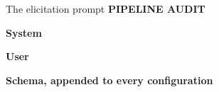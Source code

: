 \documentclass[9pt, aspectratio=169, t]{beamer}
\begin{document}
\begin{frame}{The elicitation prompt}
  \hfill\textcolor{MainBlue}{\scriptsize\textbf{PIPELINE AUDIT}}\par\vspace{-0.3em}
  {\scriptsize\textbf{System}}\vspace{-0.4em}
  
  \vspace{-0.75em}
  {\scriptsize\textbf{User}}\vspace{-0.4em}
  
  \vspace{-0.75em}
  {\scriptsize\textbf{Schema, appended to every configuration}}\vspace{-0.4em}
  
  \vspace{-0.6em}
\end{frame}
\end{document}
